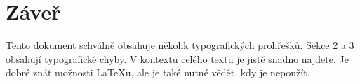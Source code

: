 \documentclass[a4paper, twocolumn, 10pt]{article}
\begin{document}
\section{Záveř}
\label{sec:end}

Tento dokument schválně obsahuje několik typografických prohřešků. Sekce \hyperref[sec:mixed]{2} a \hyperref[sec:tips]{3} obsahují typografické chyby. V kontextu celého textu je jistě snadno najdete. Je dobré znát možnosti \LaTeX u, ale je také nutné vědět, kdy je nepoužít.
\end{document}
